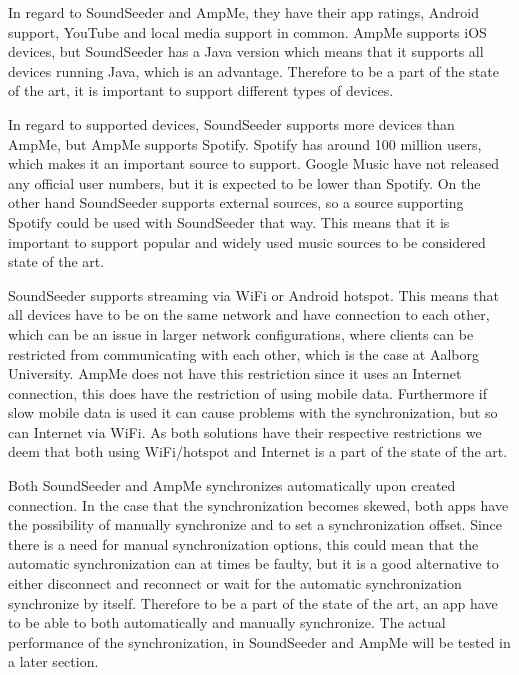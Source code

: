In regard to SoundSeeder and AmpMe, they have their app ratings, Android support, YouTube and local media support in common.
AmpMe supports iOS devices, but SoundSeeder has a Java version which means that it supports all devices running Java, which is an advantage.
Therefore to be a part of the state of the art, it is important to support different types of devices.

In regard to supported devices, SoundSeeder supports more devices than AmpMe, but AmpMe supports Spotify.
Spotify has around 100 million users, which makes it an important source to support\cite{spotify_subscribers}.
Google Music have not released any official user numbers, but it is expected to be lower than Spotify\cite{googlem_subscribers}.
On the other hand SoundSeeder supports external sources, so a source supporting Spotify could be used with SoundSeeder that way.
This means that it is important to support popular and widely used music sources to be considered state of the art.

SoundSeeder supports streaming via WiFi or Android hotspot.
This means that all devices have to be on the same network and have connection to each other,
which can be an issue in larger network configurations, where clients can be restricted from communicating with each other,
which is the case at Aalborg University.
AmpMe does not have this restriction since it uses an Internet connection, this does have the restriction of using mobile data.
Furthermore if slow mobile data is used it can cause problems with the synchronization, but so can Internet via WiFi.
As both solutions have their respective restrictions we deem that both using WiFi/hotspot and Internet is a part of the state of the art.

Both SoundSeeder and AmpMe synchronizes automatically upon created connection.
In the case that the synchronization becomes skewed, both apps have the possibility of manually synchronize and to set a synchronization offset.
Since there is a need for manual synchronization options, this could mean that the automatic synchronization can at times be faulty,
but it is a good alternative to either disconnect and reconnect or wait for the automatic synchronization synchronize by itself.
Therefore to be a part of the state of the art, an app have to be able to both automatically and manually synchronize.
The actual performance of the synchronization, in SoundSeeder and AmpMe will be tested in a later section.


